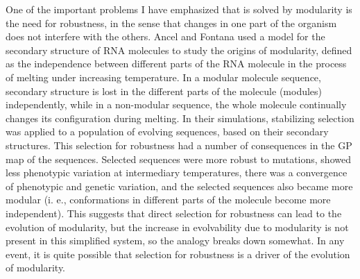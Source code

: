 \begin{refsection}
One of the important problems I have emphasized that is solved by
modularity is the need for robustness, in the sense that changes in one
part of the organism does not interfere with the others. Ancel and
Fontana \parencite{Ancel2000-vt} used a model for the secondary structure of
RNA molecules to study the origins of modularity, defined as the
independence between different parts of the RNA molecule in the process
of melting under increasing temperature. In a modular molecule sequence,
secondary structure is lost in the different parts of the molecule
(modules) independently, while in a non-modular sequence, the whole
molecule continually changes its configuration during melting. In their
simulations, stabilizing selection was applied to a population of
evolving sequences, based on their secondary structures. This selection
for robustness had a number of consequences in the GP map of the
sequences. Selected sequences were more robust to mutations, showed less
phenotypic variation at intermediary temperatures, there was a
convergence of phenotypic and genetic variation, and the selected
sequences also became more modular (i. e., conformations in different
parts of the molecule become more independent). This suggests that
direct selection for robustness can lead to the evolution of modularity,
but the increase in evolvability due to modularity is not present in
this simplified system, so the analogy breaks down somewhat. In any
event, it is quite possible that selection for robustness is a driver of
the evolution of modularity.


\end{refsection}
